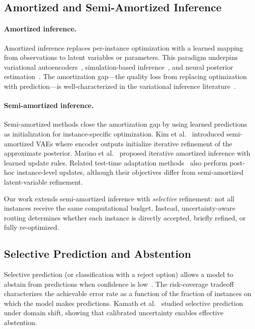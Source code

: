 \documentclass[11pt,a4paper]{article}
\begin{document}
\subsection{Amortized and Semi-Amortized Inference}

\paragraph{Amortized inference.}
Amortized inference replaces per-instance optimization with a learned mapping
from observations to latent variables or parameters.
This paradigm underpins variational autoencoders~\cite{kingma2014auto},
simulation-based inference~\cite{cranmer2020frontier},
and neural posterior estimation~\cite{papamakarios2019sequential}.
The amortization gap---the quality loss from replacing optimization with
prediction---is well-characterized in the variational inference
literature~\cite{amos2023tutorial}.

\paragraph{Semi-amortized inference.}
Semi-amortized methods close the amortization gap by using learned predictions
as initialization for instance-specific optimization.
Kim et al.~\cite{kim2018semi} introduced semi-amortized VAEs where
encoder outputs initialize iterative refinement of the approximate posterior.
Marino et al.~\cite{marino2018iterative} proposed iterative amortized inference
with learned update rules. Related test-time adaptation methods~\cite{wang2020tent}
also perform post-hoc instance-level updates, although their objectives differ
from semi-amortized latent-variable refinement.

Our work extends semi-amortized inference with \emph{selective} refinement:
not all instances receive the same computational budget.
Instead, uncertainty-aware routing determines whether each instance is
directly accepted, briefly refined, or fully re-optimized.

\subsection{Selective Prediction and Abstention}

Selective prediction (or classification with a reject option) allows a model
to abstain from predictions when confidence is low~\cite{geifman2017selective,shalev2010trading}.
The risk-coverage tradeoff characterizes the achievable error rate as a function
of the fraction of instances on which the model makes predictions.
Kamath et al.~\cite{kamath2020selective} studied selective prediction under
domain shift, showing that calibrated uncertainty enables effective abstention.
\end{document}
